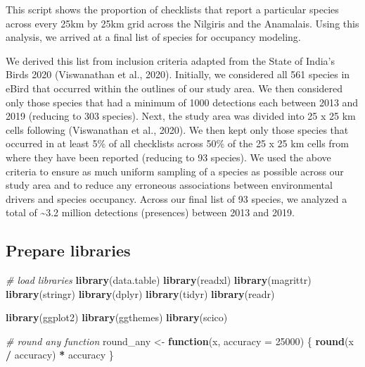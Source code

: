 \documentclass[]{article}
\newenvironment{Shaded}{\begin{snugshade}}{\end{snugshade}}
\newcommand{\CommentTok}[1]{\textcolor[rgb]{0.56,0.35,0.01}{\textit{#1}}}
\newcommand{\ControlFlowTok}[1]{\textcolor[rgb]{0.13,0.29,0.53}{\textbf{#1}}}
\newcommand{\DataTypeTok}[1]{\textcolor[rgb]{0.13,0.29,0.53}{#1}}
\newcommand{\DecValTok}[1]{\textcolor[rgb]{0.00,0.00,0.81}{#1}}
\newcommand{\KeywordTok}[1]{\textcolor[rgb]{0.13,0.29,0.53}{\textbf{#1}}}
\newcommand{\NormalTok}[1]{#1}
\newcommand{\OperatorTok}[1]{\textcolor[rgb]{0.81,0.36,0.00}{\textbf{#1}}}
\newcommand{\StringTok}[1]{\textcolor[rgb]{0.31,0.60,0.02}{#1}}
\begin{document}
This script shows the proportion of checklists that report a particular species across every 25km by 25km grid across the Nilgiris and the Anamalais. Using this analysis, we arrived at a final list of species for occupancy modeling.

We derived this list from inclusion criteria adapted from the State of India's Birds 2020 (Viswanathan et al., 2020). Initially, we considered all 561 species in eBird that occurred within the outlines of our study area. We then considered only those species that had a minimum of 1000 detections each between 2013 and 2019 (reducing to 303 species). Next, the study area was divided into 25 x 25 km cells following (Viswanathan et al., 2020). We then kept only those species that occurred in at least 5\% of all checklists across 50\% of the 25 x 25 km cells from where they have been reported (reducing to 93 species). We used the above criteria to ensure as much uniform sampling of a species as possible across our study area and to reduce any erroneous associations between environmental drivers and species occupancy. Across our final list of 93 species, we analyzed a total of \textasciitilde{}3.2 million detections (presences) between 2013 and 2019.

\hypertarget{prepare-libraries-1}{%
\subsection{Prepare libraries}\label{prepare-libraries-1}}

\begin{Shaded}
\begin{Highlighting}[numbers=left,,]
\CommentTok{# load libraries}
\KeywordTok{library}\NormalTok{(data.table)}
\KeywordTok{library}\NormalTok{(readxl)}
\KeywordTok{library}\NormalTok{(magrittr)}
\KeywordTok{library}\NormalTok{(stringr)}
\KeywordTok{library}\NormalTok{(dplyr)}
\KeywordTok{library}\NormalTok{(tidyr)}
\KeywordTok{library}\NormalTok{(readr)}

\KeywordTok{library}\NormalTok{(ggplot2)}
\KeywordTok{library}\NormalTok{(ggthemes)}
\KeywordTok{library}\NormalTok{(scico)}

\CommentTok{# round any function}
\NormalTok{round_any <-}\StringTok{ }\ControlFlowTok{function}\NormalTok{(x, }\DataTypeTok{accuracy =} \DecValTok{25000}\NormalTok{) \{}
  \KeywordTok{round}\NormalTok{(x }\OperatorTok{/}\StringTok{ }\NormalTok{accuracy) }\OperatorTok{*}\StringTok{ }\NormalTok{accuracy}
\NormalTok{\}}
\end{Highlighting}
\end{Shaded}
\end{document}
